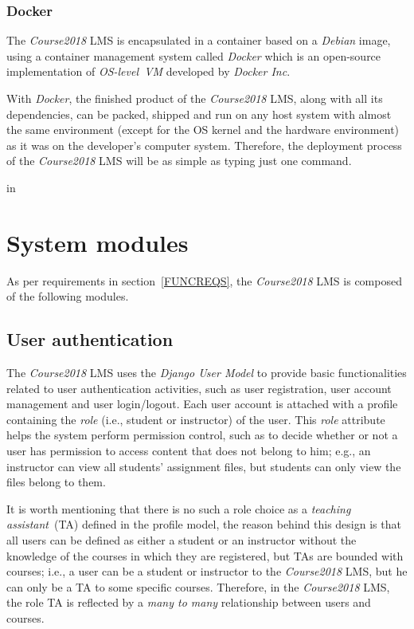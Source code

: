 \subsubsection{Docker}
The \emph{Course2018} LMS is encapsulated in a container based on a
\emph{Debian} image, using a container management system called \emph{Docker}
which is an open-source implementation of \emph{OS-level~VM} developed by
\emph{Docker Inc}.

\medskip

With \emph{Docker}, the finished product of the
\emph{Course2018} LMS, along with all its dependencies, can be packed, shipped
and run on any host system with almost the same environment
(except for the OS kernel and the hardware environment)
as it was on the
developer's computer system. Therefore, the deployment process of the
\emph{Course2018} LMS will be as simple as typing just one command.

 in


\section{System modules}

As per requirements in section~\ref{FUNCREQS}, the \emph{Course2018} LMS is composed of the
following modules.

\subsection{User authentication}
\label{sec:USRAUTH}
The \emph{Course2018} LMS uses the \emph{Django User Model} \cite{djangoUser}
to provide
basic functionalities related to user authentication activities, such as
user registration, user account management and user login/logout.
Each user account is attached with a profile containing the \emph{role}
(i.e., student or instructor) of the user. This \emph{role} attribute helps
the system perform permission control, such as to
decide whether or not a user has permission to access content
that does not belong to him; e.g., an instructor can view all students' assignment
files, but students can only view the files belong to them.

\medskip

It is worth mentioning that there is no such a role choice as a \emph{teaching
assistant}~(TA) defined in the profile model,
the reason behind this design is that all users can be defined as either a
student or an instructor without the knowledge of the courses in which they are
registered, but TAs are bounded with courses; i.e., a user
can be a student or instructor to the \emph{Course2018} LMS, but he can only
be a TA to some specific courses.
Therefore, in the \emph{Course2018} LMS, the role TA is
reflected by a \emph{many to many} relationship between users and courses.

